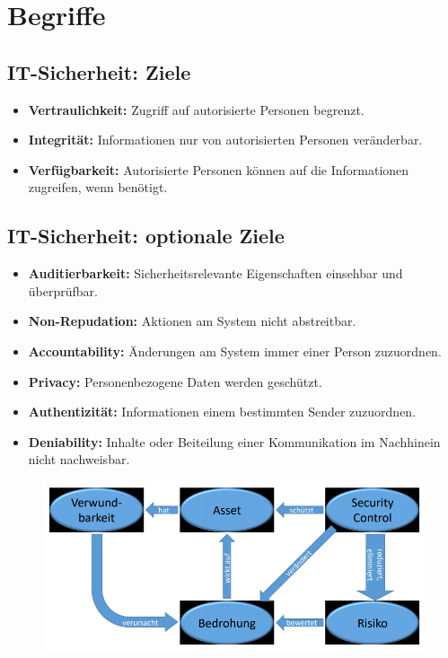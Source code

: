 
\chapter{Begriffe}
\section{IT-Sicherheit: Ziele}
\begin{itemize}
	\item \textbf{Vertraulichkeit:} Zugriff auf autorisierte Personen begrenzt.
	\item \textbf{Integrität:} Informationen nur von autorisierten Personen veränderbar.
	\item \textbf{Verfügbarkeit:} Autorisierte Personen können auf die Informationen zugreifen, wenn benötigt.
\end{itemize}

\section{IT-Sicherheit: optionale Ziele}
\begin{itemize}
	\item \textbf{Auditierbarkeit:} Sicherheitsrelevante Eigenschaften einsehbar und überprüfbar.
	\item \textbf{Non-Repudation:} Aktionen am System nicht abstreitbar.
	\item \textbf{Accountability:} Änderungen am System immer einer Person zuzuordnen.
	\item \textbf{Privacy:} Personenbezogene Daten werden geschützt.
	\item \textbf{Authentizität:} Informationen einem bestimmten Sender zuzuordnen.
	\item \textbf{Deniability:} Inhalte oder Beiteilung einer Kommunikation im Nachhinein nicht nachweisbar.
\end{itemize}
\begin{figure}[H]
	\begin{center}
		\includegraphics[scale=0.5]{Resources/Grundbegriffe.png}
		\caption{}
		\label{fig:Grundbegriffe}
	\end{center}
\end{figure}

